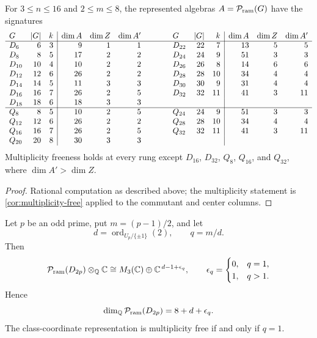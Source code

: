 \begin{proposition}
\label{prop:family-ladder-table}
For \(3\leq n\leq16\) and \(2\leq m\leq8\), the represented algebras
\(A=\mathcal P_{\mathrm{ram}}(G)\) have the signatures
\[
\begin{array}{lrr|rrr@{\qquad\qquad}lrr|rrr}
G&|G|&k&\dim A&\dim Z&\dim A'&G&|G|&k&\dim A&\dim Z&\dim A'\\
\cline{1-6}\cline{7-12}
D_6   & 6&3& 9&1&1  & D_{22}&22& 7&13&5&5\\
D_8   & 8&5&17&2&2  & D_{24}&24& 9&51&3&3\\
D_{10}&10&4&10&2&2  & D_{26}&26& 8&14&6&6\\
D_{12}&12&6&26&2&2  & D_{28}&28&10&34&4&4\\
D_{14}&14&5&11&3&3  & D_{30}&30& 9&31&4&4\\
D_{16}&16&7&26&2&5  & D_{32}&32&11&41&3&11\\
D_{18}&18&6&18&3&3  &&&&&&\\
\cline{1-6}\cline{7-12}
Q_8   & 8&5&10&2&5  & Q_{24}&24& 9&51&3&3\\
Q_{12}&12&6&26&2&2  & Q_{28}&28&10&34&4&4\\
Q_{16}&16&7&26&2&5  & Q_{32}&32&11&41&3&11\\
Q_{20}&20&8&30&3&3  &&&&&&\\
\end{array}
\]
Multiplicity freeness holds at every rung except
\(D_{16}\), \(D_{32}\), \(Q_8\), \(Q_{16}\), and \(Q_{32}\), where
\(\dim A'>\dim Z\).
\end{proposition}

\begin{proof}
Rational computation as described above; the multiplicity
statement is \cref{cor:multiplicity-free} applied to the commutant and
center columns.
\end{proof}

\begin{theorem}
\label{thm:dihedral-prime-law}
Let \(p\) be an odd prime, put \(m=(p-1)/2\), and let
\[
 d=\operatorname{ord}_{U_p/\{\pm1\}}(2),\qquad q=m/d.
\]
Then
\[
 \mathcal P_{\mathrm{ram}}(D_{2p})\otimes_\mathbb Q\mathbb C
 \cong M_3(\mathbb C)\oplus\mathbb C^{\,d-1+\epsilon_q},
 \qquad
 \epsilon_q=
 \begin{cases}
 0,&q=1,\\
 1,&q>1.
 \end{cases}
\]
Hence
\[
 \dim_\mathbb Q\mathcal P_{\mathrm{ram}}(D_{2p})=8+d+\epsilon_q.
\]
The class-coordinate representation is multiplicity free if and only if
\(q=1\).
\end{theorem}

